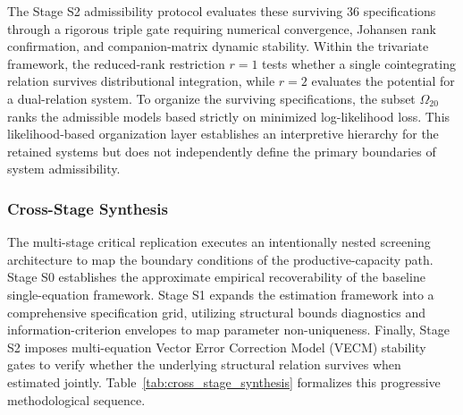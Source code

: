 \documentclass[11pt]{article}
\begin{document}
The Stage S2 admissibility protocol evaluates these surviving 36 specifications through a rigorous triple gate requiring numerical convergence, Johansen rank confirmation, and companion-matrix dynamic stability. Within the trivariate framework, the reduced-rank restriction $r=1$ tests whether a single cointegrating relation survives distributional integration, while $r=2$ evaluates the potential for a dual-relation system. To organize the surviving specifications, the subset $\Omega_{20}$ ranks the admissible models based strictly on minimized log-likelihood loss. This likelihood-based organization layer establishes an interpretive hierarchy for the retained systems but does not independently define the primary boundaries of system admissibility.

\subsubsection{Cross-Stage Synthesis}
\label{subsec:cross_stage_synthesis}

The multi-stage critical replication executes an intentionally nested screening architecture to map the boundary conditions of the productive-capacity path. Stage S0 establishes the approximate empirical recoverability of the baseline single-equation framework. Stage S1 expands the estimation framework into a comprehensive specification grid, utilizing structural bounds diagnostics and information-criterion envelopes to map parameter non-uniqueness. Finally, Stage S2 imposes multi-equation Vector Error Correction Model (VECM) stability gates to verify whether the underlying structural relation survives when estimated jointly. Table~\ref{tab:cross_stage_synthesis} formalizes this progressive methodological sequence.
\end{document}
